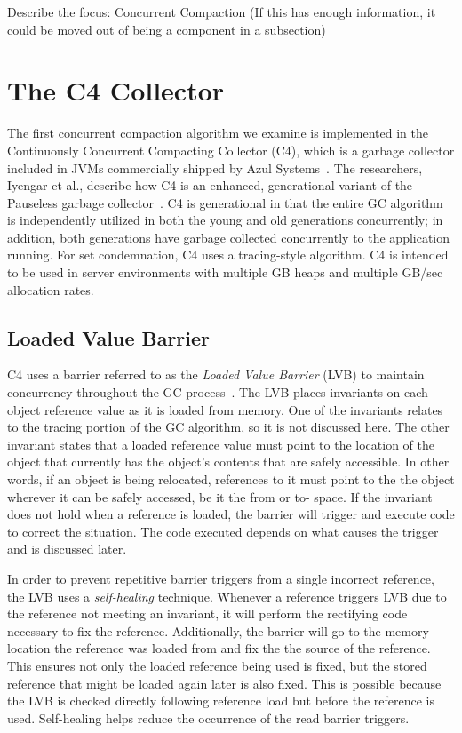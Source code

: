 \documentclass{sig-alternate}
\begin{document}
Describe the focus: Concurrent Compaction (If this has enough information, 
it could be moved out of being a component in a subsection)


\section{The C4 Collector}
\label{sec:c4}

The first concurrent compaction algorithm we examine is implemented in the 
Continuously Concurrent Compacting Collector (C4), which is a garbage collector 
included in JVMs commercially shipped by Azul Systems~\cite{Tene:C4}. The 
researchers, Iyengar et al., describe how C4 is an enhanced, generational variant
of the Pauseless garbage collector~\cite{Click:Pauseless}. C4 is generational in 
that the entire GC algorithm is independently utilized in both the young and old generations 
concurrently; in addition, both generations have garbage collected concurrently 
to the application running. For set condemnation, C4 uses a tracing-style algorithm.
C4 is intended to be used in server environments with multiple GB heaps and 
multiple GB/sec allocation rates.


\subsection{Loaded Value Barrier}
\label{sec:c4LVB}

C4 uses a barrier referred to as the \emph{Loaded Value Barrier} (LVB) to 
maintain concurrency throughout the GC process~\cite{Tene:C4}. The LVB 
places invariants on each object reference value as it is loaded from memory.
One of the invariants relates to the tracing portion of the GC algorithm, so
it is not discussed here. The other invariant states that a loaded
reference value must point to the location of the object that currently has the
object's contents that are safely accessible. 
In other words, if an object is being relocated, references to it must point 
to the the object wherever it can be safely accessed, be it the from or to-
space. If the invariant does not hold
when a reference is loaded, the barrier will trigger and execute code to correct
the situation. The code executed depends on what causes the trigger
and is discussed later.

In order to prevent repetitive barrier triggers from a single incorrect reference,
the LVB uses a \emph{self-healing} technique. Whenever a reference triggers LVB
due to the reference not meeting an invariant, it will perform the rectifying code
necessary to fix the reference. Additionally, the barrier will go to the memory
location the reference was loaded from and fix the the source of the reference. This
ensures not only the loaded reference being used is fixed, but the stored reference
that might be loaded again later is also fixed. This is possible because the LVB 
is checked directly following reference load but before the reference is used.
Self-healing helps reduce the occurrence of the read barrier triggers.
\end{document}
